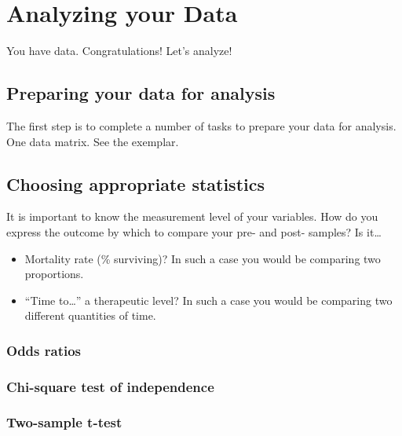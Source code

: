 \documentclass[
]{report}
\providecommand{\tightlist}{%
  \setlength{\itemsep}{0pt}\setlength{\parskip}{0pt}}
\begin{document}
\hypertarget{analyzing-your-data}{%
\chapter{Analyzing your Data}\label{analyzing-your-data}}

You have data. Congratulations! Let's analyze!

\hypertarget{preparing-your-data-for-analysis}{%
\section{Preparing your data for
analysis}\label{preparing-your-data-for-analysis}}

The first step is to complete a number of tasks to prepare your data for
analysis. One data matrix. See the exemplar.

\hypertarget{choosing-appropriate-statistics}{%
\section{Choosing appropriate
statistics}\label{choosing-appropriate-statistics}}

It is important to know the measurement level of your variables. How do
you express the outcome by which to compare your pre- and post- samples?
Is it\ldots{}

\begin{itemize}
\tightlist
\item
  Mortality rate (\% surviving)? In such a case you would be comparing
  two proportions.
\item
  ``Time to\ldots{}'' a therapeutic level? In such a case you would be
  comparing two different quantities of time.
\end{itemize}

\hypertarget{odds-ratios}{%
\subsection{Odds ratios}\label{odds-ratios}}

\hypertarget{chi-square-test-of-independence}{%
\subsection{Chi-square test of
independence}\label{chi-square-test-of-independence}}

\hypertarget{two-sample-t-test}{%
\subsection{Two-sample t-test}\label{two-sample-t-test}}
\end{document}
